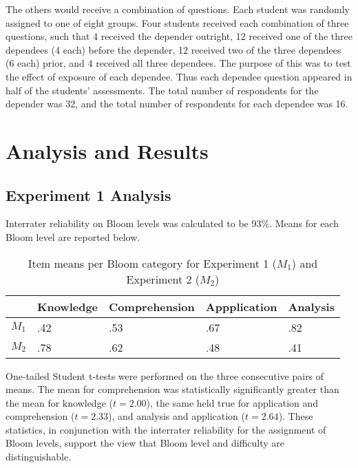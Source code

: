 The others would receive a combination of questions.  Each student was randomly
assigned to one of eight groups.  Four students received each combination of
three questions, such that 4 received the depender outright, 12 received one of
the three dependees (4 each) before the depender, 12 received two of the three
dependees (6 each) prior, and 4 received all three dependees.  The purpose of
this was to test the effect of exposure of each dependee.  Thus each dependee
question appeared in half of the students' assessments.  The total number of
respondents for the depender was 32, and the total number of respondents for
each dependee was 16.  

\section{Analysis and Results}

\subsection{Experiment 1 Analysis}

Interrater reliability on Bloom levels was calculated to be 93\%.  Means for
each Bloom level are reported below.

\begin{table}
\caption{Item means per Bloom category for Experiment 1 ($M_1$) and Experiment 2 ($M_2$)}
\vspace{12pt}
\begin{tabularx}{\textwidth}{|X|X|X|X|X|}
                                                                 \hline
      & \y Knowledge & \y Comprehension & \y Appplication & \y Analysis \\ \hline
\y $M_1$  &  .42 & .53 & .67 & .82  \\ \hline
\y $M_2$  &  .78 & .62 & .48 & .41  \\ \hline
\end{tabularx}
\vspace{24pt}
\end{table}

One-tailed Student t-tests were performed on the three consecutive pairs of
means.  The mean for comprehension was statistically significantly greater than
the mean for knowledge ($t=2.00$), the same held true for application and
comprehension ($t=2.33$), and analysis and application ($t=2.64$).  These
statistics, in conjunction with the interrater reliability for the assignment
of Bloom levels, support the view that Bloom level and difficulty are
distinguishable.

